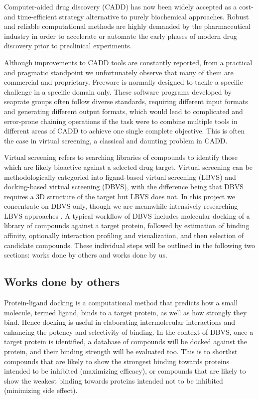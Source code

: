 \documentclass[a4paper,12pt]{article}
\begin{document}
Computer-aided drug discovery (CADD) has now been widely accepted as a cost- and time-efficient strategy alternative to purely biochemical approaches. Robust and reliable computational methods are highly demanded by the pharmaceutical industry in order to accelerate or automate the early phases of modern drug discovery prior to preclinical experiments.

Although improvements to CADD tools are constantly reported, from a practical and pragmatic standpoint we unfortunately observe that many of them are commercial and proprietary. Freeware is normally designed to tackle a specific challenge in a specific domain only. These software programs developed by seaprate groups often follow diverse standards, requiring different input formats and generating different output formats, which would lead to complicated and error-prone chaining operations if the task were to combine multiple tools in different areas of CADD to achieve one single complete objective. This is often the case in virtual screening, a classical and daunting problem in CADD.

Virtual screening refers to searching libraries of compounds to identify those which are likely bioactive against a selected drug target. Virtual screening can be methodologically categoried into ligand-based virtual screening (LBVS) and docking-based virtual screening (DBVS), with the difference being that DBVS requires a 3D structure of the target but LBVS does not. In this project we concentrate on DBVS only, though we are meanwhile intensively researching LBVS approaches \citep{1749}. A typical workflow of DBVS includes molecular docking of a library of compounds against a target protein, followed by estimation of binding affinity, optionally interaction profiling and visualization, and then selection of candidate compounds. These individual steps will be outlined in the following two sections: works done by others and works done by us.

\subsection*{Works done by others}

Protein-ligand docking is a computational method that predicts how a small molecule, termed ligand, binds to a target protein, as well as how strongly they bind. Hence docking is useful in elaborating intermolecular interactions and enhancing the potency and selectivity of binding. In the context of DBVS, once a target protein is identified, a database of compounds will be docked against the protein, and their binding strength will be evaluated too. This is to shortlist compounds that are likely to show the strongest binding towards proteins intended to be inhibited (maximizing efficacy), or compounds that are likely to show the weakest binding towards proteins intended not to be inhibited (minimizing side effect).
\end{document}
